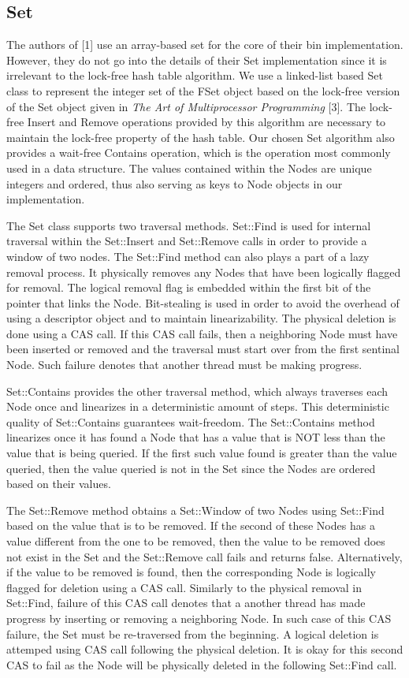 \documentclass[11pt]{article} %
\begin{document}
\subsection{Set}

The authors of [1] use an array-based set for the core of their bin implementation. However, they do not go into the details of their Set implementation since it is irrelevant to the lock-free hash table algorithm. We use a linked-list based Set class to represent the integer set of the FSet object based on the lock-free version of the Set object given in \textit{The Art of Multiprocessor Programming} [3]. The lock-free Insert and Remove operations provided by this algorithm are necessary to maintain the lock-free property of the hash table. Our chosen Set algorithm also provides a wait-free Contains operation, which is the operation most commonly used in a data structure. The values contained within the Nodes are unique integers and ordered, thus also serving as keys to Node objects in our implementation.

The Set class supports two traversal methods. Set::Find is used for internal traversal within the Set::Insert and Set::Remove calls in order to provide a window of two nodes. The Set::Find method can also plays a part of a lazy removal process. It physically removes any Nodes that have been logically flagged for removal. The logical removal flag is embedded within the first bit of the pointer that links the Node. Bit-stealing is used in order to avoid the overhead of using a descriptor object and to maintain linearizability. The physical deletion is done using a CAS call. If this CAS call fails, then a neighboring Node must have been inserted or removed and the traversal must start over from the first sentinal Node. Such failure denotes that another thread must be making progress.

Set::Contains provides the other traversal method, which always traverses each Node once and linearizes in a deterministic amount of steps. This deterministic quality of Set::Contains guarantees wait-freedom. The Set::Contains method linearizes once it has found a Node that has a value that is NOT less than the value that is being queried. If the first such value found is greater than the value queried, then the value queried is not in the Set since the Nodes are ordered based on their values.
 
The Set::Remove method obtains a Set::Window of two Nodes using Set::Find based on the value that is to be removed. If the second of these Nodes has a value different from the one to be removed, then the value to be removed does not exist in the Set and the Set::Remove call fails and returns false. Alternatively, if the value to be removed is found, then the corresponding Node is logically flagged for deletion using a CAS call. Similarly to the physical removal in Set::Find, failure of this CAS call denotes that a another thread has made progress by inserting or removing a neighboring Node. In such case of this CAS failure, the Set must be re-traversed from the beginning. A logical deletion is attemped using CAS call following the physical deletion. It is okay for this second CAS to fail as the Node will be physically deleted in the following Set::Find call.
\end{document}
